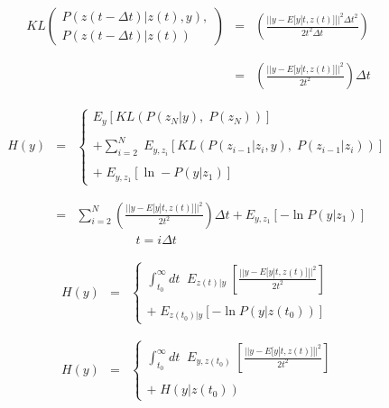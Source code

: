 {{\vfill
\begin{eqnarray*}
  KL\left(\begin{array}{l}P(z(t-\Delta t)|z(t),y), \\P(z(t-\Delta  t)|z(t))\end{array}\right)
  & = & \left(\frac{||y-E[y|t,z(t)]||^2\Delta t^2}{2t^2\Delta t}\right) \\
  \\
  \\
  & =  & \left(\frac{||y-E[y|t,z(t)]||^2}{2t^2}\right) \Delta t
\end{eqnarray*}
}

\begin{eqnarray*}
  H(y) & = & \left\{\begin{array}{l} E_y[KL(P(z_N|y),\;P(z_N))] \\ \\ + \sum_{i=2}^N  \; E_{y,z_i}[KL(P(z_{i-1}|z_i,y),\;P(z_{i-1}|z_i))] \\ \\ +\;E_{y,z_1}[\ln -P(y|z_1)] \end{array}\right.
  \\
  \\
  \\
  & = & \sum_{i = 2}^N  \left(\frac{||y-E[y|t,z(t)]||^2}{2t^2}\right) \Delta t + E_{y,z_1}[- \ln P(y|z_1)] \\
  & & \;\;\;\;\;\;\;\;\;\;\;\;\;\;\;\;\;t = i\Delta t
\end{eqnarray*}


\begin{eqnarray*}
H(y) & = & \left\{\begin{array}{l}\int_{t_0}^\infty dt \;\; E_{z(t)|y}\;\left[\frac{||y - E[y|t,z(t)]||^2}{2t^2}\right] \\ \\ + \;E_{z(t_0)|y}[-\ln P(y|z(t_0))]\end{array}\right. \\
\\
\\
  H(y) & = & \left\{\begin{array}{l}\int_{t_0}^\infty dt \;\; E_{y,z(t_0)}\;\left[\frac{||y - E[y|t,z(t)]||^2}{2t^2}\right] \\ \\ +\;H(y|z(t_0))\end{array}\right.
\end{eqnarray*}

}
